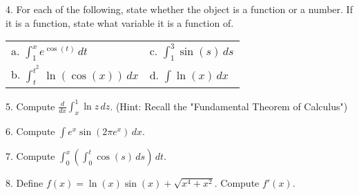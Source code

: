 \documentclass[paper=a4, fontsize=11pt]{scrartcl} %
\numberwithin{equation}{section} %
\numberwithin{figure}{section} %
\numberwithin{table}{section} %
\begin{document}
4. For each of the following, state whether the object is a function or a number.  If it is a function, state what variable it is a function of.\\

\begin{tabularx}{\textwidth}{ X X }
a. \quad $\displaystyle \int_1^x e^{\cos(t)}\,dt$ &
c. \quad $\displaystyle \int_1^3 \sin(s)\,ds$ \\
\noalign{\smallskip}\noalign{\smallskip}\noalign{\smallskip}\noalign{\smallskip}
b. \quad $\displaystyle \int_t^{t^2}\,\ln(\cos(x))\,dx$ &
d. \quad $\displaystyle \int \ln(x)\,dx$
\end{tabularx}

\newpage

5. Compute $\displaystyle \frac{d}{dx} \int_x^1 \ln z\,dz$.  (Hint: Recall the "Fundamental Theorem of Calculus")

\vfill

6. Compute $\displaystyle \int e^x\sin(2\pi e^x)\,dx$.

\vfill

7. Compute $\displaystyle \int_0^x \left( \int_0^t \cos(s)\,ds \right)\,dt$.

\vfill

8. Define $\displaystyle f(x) = \ln(x)\sin(x) + \sqrt{x^4 + x^2}$.  Compute $f'(x)$.

\vfill
\end{document}
